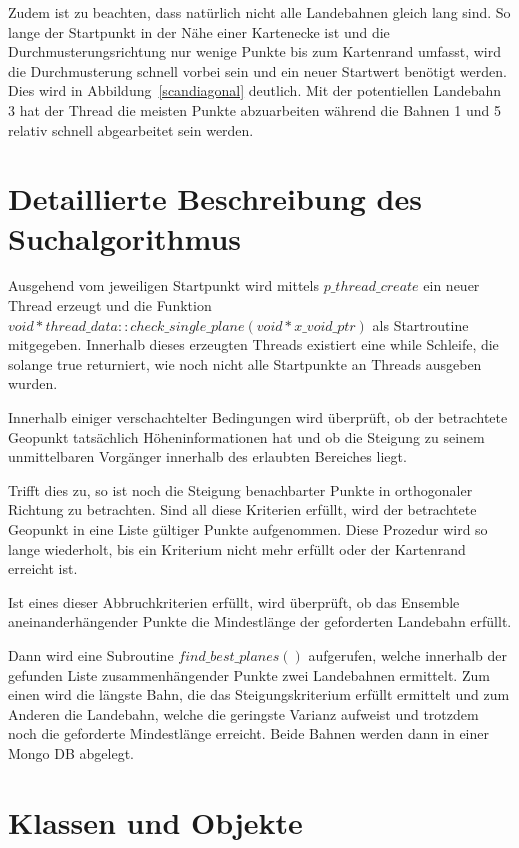 \documentclass[10pt,a4paper]{report}
\begin{document}
Zudem ist zu beachten, dass natürlich nicht alle Landebahnen gleich lang sind. So lange der Startpunkt in der Nähe einer Kartenecke ist und die Durchmusterungsrichtung nur wenige Punkte bis zum Kartenrand umfasst, wird die Durchmusterung schnell vorbei sein und ein neuer Startwert benötigt werden. Dies wird in Abbildung~\ref{scandiagonal} deutlich. Mit der potentiellen Landebahn 3 hat der Thread die meisten Punkte abzuarbeiten während die Bahnen 1 und 5 relativ schnell abgearbeitet sein werden. 

\section{Detaillierte Beschreibung des Suchalgorithmus}

Ausgehend vom jeweiligen Startpunkt wird mittels $p\_thread\_create$ ein neuer Thread erzeugt und die Funktion $void *thread\_data::check\_single\_plane(void *x\_void\_ptr)$ als Startroutine mitgegeben. Innerhalb dieses erzeugten Threads existiert eine while Schleife, die solange true returniert, wie noch nicht alle Startpunkte an Threads ausgeben wurden.

Innerhalb einiger verschachtelter Bedingungen wird überprüft, ob der betrachtete Geopunkt tatsächlich Höheninformationen hat und ob die Steigung zu seinem unmittelbaren Vorgänger innerhalb des erlaubten Bereiches liegt.

Trifft dies zu, so ist noch die Steigung benachbarter Punkte in orthogonaler Richtung zu betrachten. Sind all diese Kriterien erfüllt, wird der betrachtete Geopunkt in eine Liste gültiger Punkte aufgenommen. Diese Prozedur wird so lange wiederholt, bis ein Kriterium nicht mehr erfüllt oder der Kartenrand erreicht ist.

Ist eines dieser Abbruchkriterien erfüllt, wird überprüft, ob das Ensemble aneinanderhängender Punkte die Mindestlänge der geforderten Landebahn erfüllt.

Dann wird eine Subroutine $find\_best\_planes()$ aufgerufen, welche innerhalb der gefunden Liste zusammenhängender Punkte zwei Landebahnen ermittelt. Zum einen wird die längste Bahn, die das Steigungskriterium erfüllt ermittelt und zum Anderen die Landebahn, welche die geringste Varianz aufweist und trotzdem noch die geforderte Mindestlänge erreicht. 
Beide Bahnen werden dann in einer Mongo DB abgelegt.

\section{Klassen und Objekte}
\end{document}
